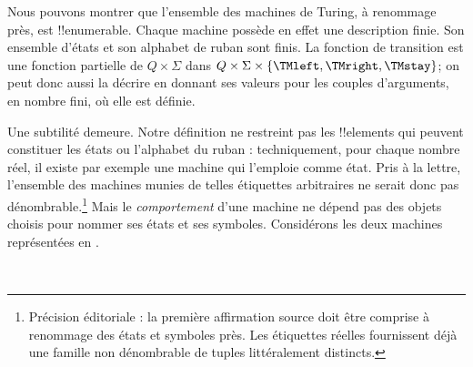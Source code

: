 \documentclass[../../../include/open-logic-section]{subfiles}
\begin{document}

\begin{explain}
Nous pouvons montrer que l'ensemble des machines de Turing, à renommage près, est
!!{enumerable}. Chaque machine possède en effet une description
finie. Son ensemble d'états et son alphabet de ruban sont finis.
La fonction de transition est une fonction partielle de
$Q \times \Sigma$ dans
$Q \times \Sigma \times \{\TMleft, \TMright, \TMstay\}$;
on peut donc aussi la décrire en donnant ses valeurs pour les
couples d'arguments, en nombre fini, où elle est définie.

Une subtilité demeure. Notre définition ne restreint pas les
!!{element}s qui peuvent constituer les états ou l'alphabet du
ruban : techniquement, pour chaque nombre réel, il existe par
exemple une machine qui l'emploie comme état. Pris à la lettre,
l'ensemble des machines munies de telles étiquettes arbitraires
ne serait donc pas dénombrable.\footnote{Précision éditoriale : la première affirmation source doit être comprise à renommage des états et symboles près. Les étiquettes réelles fournissent déjà une famille non dénombrable de tuples littéralement distincts.} Mais le \emph{comportement} d'une
machine ne dépend pas des objets choisis pour nommer ses états
et ses symboles. Considérons les deux machines représentées en
.
\begin{figure}
\begin{center}
\\
\end{center}
\end{figure}
\end{explain}
\end{document}
